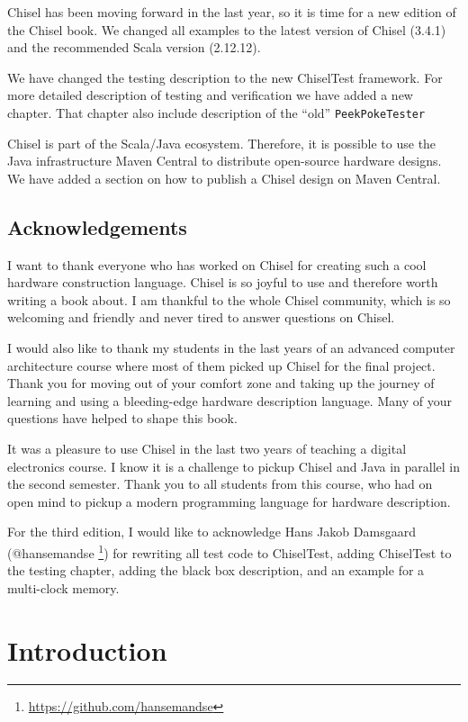 \documentclass[%
    10pt,
    headinclude, footexclude,
    openright, %
    notitlepage,
    cleardoubleempty,
    headsepline,
    pointlessnumbers,
    bibtotoc, idxtotoc,
    ]{scrbook}
\newcommand{\code}[1]{{\small{\texttt{#1}}}}
\newcommand{\myref}[2]{\href{#1}{#2}}
\renewcommand{\myref}[2]{{#2}{\footnote{\url{#1}}}}
\begin{document}
Chisel has been moving forward in the last year, so it is time for a new edition of the Chisel book.
We changed all examples to the latest version of Chisel (3.4.1) and the recommended
Scala version (2.12.12).

We have changed the testing description to the new ChiselTest framework. For more detailed
description of testing and verification we have added a new chapter. That chapter also
include description of the ``old'' \code{PeekPokeTester}

Chisel is part of the Scala/Java ecosystem. Therefore, it is possible to use the Java infrastructure
Maven Central to distribute open-source hardware designs. We have added a section on how to publish
a Chisel design on Maven Central.


\section*{Acknowledgements}

I want to thank everyone who has worked on Chisel for creating such
a cool hardware construction language. Chisel is so joyful to use and
therefore worth writing a book about.
I am thankful to the whole Chisel community, which is so welcoming and friendly
and never tired to answer questions on Chisel.

I would also like to thank my students in the last years of an advanced computer
architecture course where most of them picked up Chisel for the final project.
Thank you for moving out of your comfort zone and taking up the journey of
learning and using a bleeding-edge hardware description language.
Many of your questions have helped to shape this book.

It was a pleasure to use Chisel in the last two years of teaching a digital electronics
course. I know it is a challenge to pickup Chisel and Java in parallel in the second
semester. Thank you to all students from this course, who had on open mind to
pickup a modern programming language for hardware description.

For the third edition, I would like to acknowledge Hans Jakob Damsgaard
(\myref{https://github.com/hansemandse}{@hansemandse }) for rewriting
all test code to ChiselTest, adding ChiselTest to the testing chapter, adding the black
box description, and an example for a multi-clock memory.


\mainmatter

\chapter{Introduction}
\label{sec:intro}
\end{document}
